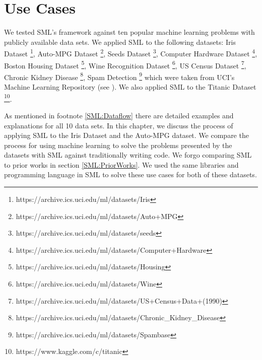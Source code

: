 \section{Use Cases}
\label{use-cases}

We tested SML's framework against ten popular machine learning problems with publicly available data sets. We applied SML to the following datasets: Iris Dataset \footnote{https://archive.ics.uci.edu/ml/datasets/Iris}, Auto-MPG Dataset \footnote{https://archive.ics.uci.edu/ml/datasets/Auto+MPG}, Seeds Dataset \footnote{https://archive.ics.uci.edu/ml/datasets/seeds},  Computer Hardware Dataset \footnote{https://archive.ics.uci.edu/ml/datasets/Computer+Hardware},  Boston Housing Dataset \footnote{https://archive.ics.uci.edu/ml/datasets/Housing}, Wine Recognition Dataset \footnote{https://archive.ics.uci.edu/ml/datasets/Wine}, US Census Dataset \footnote{https://archive.ics.uci.edu/ml/datasets/US+Census+Data+(1990)}, Chronic Kidney Disease \footnote{https://archive.ics.uci.edu/ml/datasets/Chronic\_Kidney\_Disease}, Spam Detection \footnote{https://archive.ics.uci.edu/ml/datasets/Spambase} which were taken from UCI's Machine Learning Repository (see \cite{Lichman:2013}).  We also applied SML to the Titanic Dataset \footnote{https://www.kaggle.com/c/titanic}.  

As mentioned in footnote \ref{SML:Dataflow} there are detailed examples and explanations for all 10 data sets.  In this chapter, we discuss the process of applying SML to the Iris Dataset and the Auto-MPG dataset.   We compare the process for using machine learning to solve the problems presented by the datasets with SML against traditionally writing code.  We forgo comparing SML to prior works in section \ref{SML:PriorWorks}.  We used the same libraries and programming language in SML to solve these use cases for both of these datasets. 

